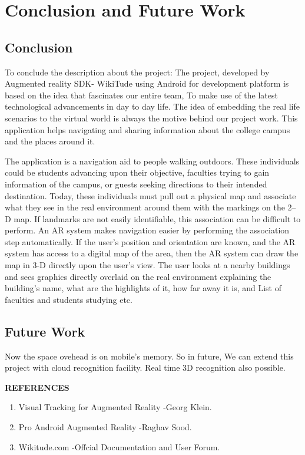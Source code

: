 \documentclass{article}
\begin{document}

\newpage
\section{Conclusion and Future Work}
\subsection{Conclusion}
\par To conclude the description about the project: The project, developed by Augmented reality SDK- WikiTude using Android for development platform is based on the idea that fascinates our entire team, To make use of the latest technological advancements in day to day life. The idea of embedding the real life scenarios to the virtual world is always the motive behind our project work. This application helps navigating and sharing information about the college campus and the places around it. 
\par The application is a navigation aid to people walking outdoors.  These individuals could be students advancing upon their objective, faculties trying to gain information of the campus, or guests seeking directions to their intended destination.  Today, these individuals must pull out a physical map and associate what they see in the real environment around them with the markings on the 2–D map.  If landmarks are not easily identifiable, this association can be difficult to perform.  An AR system makes navigation easier by performing the association step automatically.  If the user's position and orientation are known, and the AR system has access to a digital map of the area, then the AR system can draw the map in 3-D directly upon the user's view.  The user looks at a nearby buildings and sees graphics directly overlaid on the real environment explaining the building’s name, what are the highlights of it, how far away it is, and List of faculties and students studying etc. 

\subsection{Future Work}
\par Now the space ovehead is on mobile's memory. So in future, We can extend this project with cloud recognition facility. Real time 3D recognition also possible.






\newpage
% 
{\centering \Large \textbf{REFERENCES}}\\[.5cm]
\begin{enumerate}
\item Visual Tracking for Augmented Reality -Georg Klein.
\item Pro Android Augmented Reality  -Raghav Sood.
\item Wikitude.com -Offcial Documentation and User Forum.
\end{enumerate}
\end{document}
